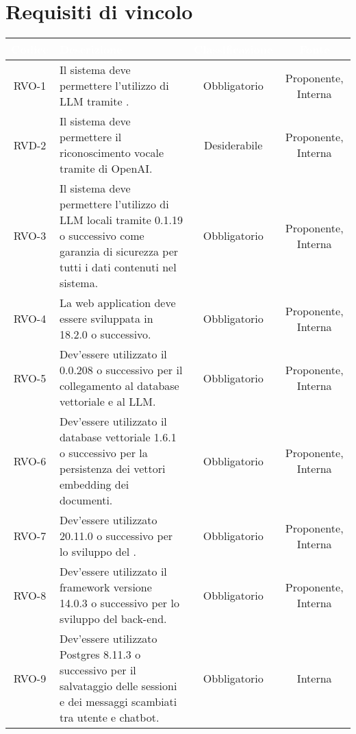 \section{Requisiti di vincolo}

\begingroup
\setlength{\tabcolsep}{10pt}
\renewcommand{\arraystretch}{1.5}
\begin{xltabular}{\textwidth}{| c | X | c | c |}
    \hline
     \textbf{\textcolor{white}{Codice}} & \textbf{\textcolor{white}{Descrizione}} & \textbf{\textcolor{white}{Classificazione}} & \textbf{\textcolor{white}{Fonte}}\\
    \hline
    \endhead
   
    RVO-1 & Il sistema deve permettere l'utilizzo di LLM tramite . & Obbligatorio & Proponente, Interna \\
    \hline
    RVD-2 & Il sistema deve permettere il riconoscimento vocale tramite  di OpenAI. & Desiderabile & Proponente, Interna \\
    \hline
    RVO-3 & Il sistema deve permettere l'utilizzo di LLM locali tramite  0.1.19 o successivo come garanzia di sicurezza per tutti i dati contenuti nel sistema. & Obbligatorio & Proponente, Interna \\
    \hline
    RVO-4 & La web application deve essere sviluppata in  18.2.0 o successivo. & Obbligatorio & Proponente, Interna \\
    \hline
    RVO-5 & Dev'essere utilizzato il   0.0.208 o successivo per il collegamento al database vettoriale e al LLM. & Obbligatorio & Proponente, Interna \\
    \hline
    RVO-6 & Dev'essere utilizzato il database vettoriale  1.6.1 o successivo per la persistenza dei vettori embedding dei documenti. & Obbligatorio & Proponente, Interna \\
    \hline
    RVO-7 & Dev'essere utilizzato  20.11.0 o successivo per lo sviluppo del . & Obbligatorio & Proponente, Interna \\
    \hline
    RVO-8 & Dev'essere utilizzato il framework  versione 14.0.3 o successivo per lo sviluppo del back-end. & Obbligatorio & Proponente, Interna \\
    \hline
    RVO-9 & Dev'essere utilizzato Postgres 8.11.3 o successivo per il salvataggio delle sessioni e dei messaggi scambiati tra utente e chatbot. & Obbligatorio & Interna \\

\end{xltabular}
